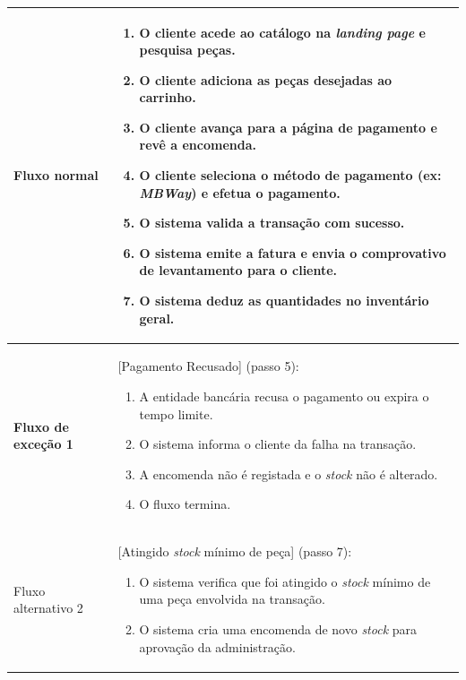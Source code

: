 \documentclass[a4paper,12pt]{scrreprt}
\begin{document}
\begin{longtable}{|>{\columncolor{black!10}\bfseries}p{3.5cm}|p{11.5cm}|}
Fluxo normal & 
\begin{enumerate}[leftmargin=*, nosep, topsep=2pt, partopsep=0pt]
    \item O cliente acede ao catálogo na \textit{landing page} e pesquisa peças.
    \item O cliente adiciona as peças desejadas ao carrinho.
    \item O cliente avança para a página de pagamento e revê a encomenda.
    \item O cliente seleciona o método de pagamento (ex: \textit{MBWay}) e efetua o pagamento.
    \item O sistema valida a transação com sucesso.
    \item O sistema emite a fatura e envia o comprovativo de levantamento para o cliente.
    \item O sistema deduz as quantidades no inventário geral.
\end{enumerate} \\ \hline

Fluxo de exceção 1 & [Pagamento Recusado] (passo 5):
\begin{enumerate}[label=5.\arabic*., leftmargin=*, nosep, topsep=2pt, partopsep=0pt]
    \item A entidade bancária recusa o pagamento ou expira o tempo limite.
    \item O sistema informa o cliente da falha na transação.
    \item A encomenda não é registada e o \textit{stock} não é alterado.
    \item O fluxo termina.
\end{enumerate} \\ \hline

Fluxo alternativo 2 & [Atingido \textit{stock} mínimo de peça] (passo 7):
\begin{enumerate}[label=7.\arabic*., leftmargin=*, nosep, topsep=2pt, partopsep=0pt]
    \item O sistema verifica que foi atingido o \textit{stock} mínimo de uma peça envolvida na transação.
    \item O sistema cria uma encomenda de novo \textit{stock} para aprovação da administração.
\end{enumerate} \\ \hline

\end{longtable}
\end{document}
